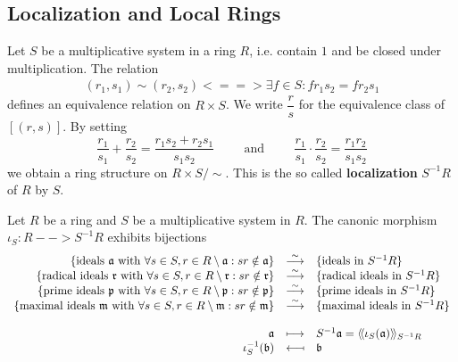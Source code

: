 	\newpage
	\subsection{Localization and Local Rings}

	\begin{definition}
		Let $S$ be a multiplicative system in a ring $R$, i.e. contain $1$ and be closed under multiplication. The relation
		\begin{align*}
			(r_1,s_1) \sim (r_2,s_2) <==> \exists f\in S: fr_1s_2 = fr_2s_1
		\end{align*}
		defines an equivalence relation on $R \times S$. We write $\dfrac{r}{s}$ for the equivalence class of $[(r,s)]$. By setting
		\begin{equation*}
			\dfrac{r_1}{s_1} + \dfrac{r_2}{s_2} = \dfrac{r_1s_2 + r_2s_1}{s_1s_2} \hspace{1cm}\text{and}\hspace{1cm} \dfrac{r_1}{s_1} \cdot \dfrac{r_2}{s_2} = \dfrac{r_1r_2}{s_1s_2}
		\end{equation*}
		we obtain a ring structure on $R \times S / \sim$. This is the so called \textbf{localization} $S^{-1}R$ of $R$ by $S$.
	\end{definition}


	\begin{theorem}
		Let $R$ be a ring and $S$ be a multiplicative system in $R$. The canonic morphism $\iota_S: R --> S^{-1}R$ exhibits bijections
		\begin{equation*}
			\begin{array}{rcl}
				\{\text{ideals }\ideal{a}\text{ with } \forall s \in S, r \in R \setminus \ideal{a}: sr \notin \ideal{a}\} &\overset{\sim}{\longrightarrow} &\{\text{ideals in } S^{-1}R\}\\
				\{\text{radical ideals }\ideal{r}\text{ with } \forall s \in S, r \in R \setminus \ideal{r}: sr \notin \ideal{r}\} &\overset{\sim}{\longrightarrow} &\{\text{radical ideals in } S^{-1}R\}\\
				\{\text{prime ideals }\ideal{p}\text{ with } \forall s \in S, r \in R \setminus \ideal{p}: sr \notin \ideal{p}\} &\overset{\sim}{\longrightarrow} &\{\text{prime ideals in } S^{-1}R\}\\
				\{\text{maximal ideals }\ideal{m}\text{ with } \forall s \in S, r \in R \setminus \ideal{m}: sr \notin \ideal{m}\} &\overset{\sim}{\longrightarrow} &\{\text{maximal ideals in } S^{-1}R\}\\\\
				\ideal{a} &\longmapsto &S^{-1}\ideal{a} = \Gen{\iota_S(\ideal{a})}_{S^{-1}R}\\
				\iota_S^{-1}(\ideal{b}) &\reflectbox{$\longmapsto$} &\ideal{b}
			\end{array}
		\end{equation*}
	\end{theorem}

